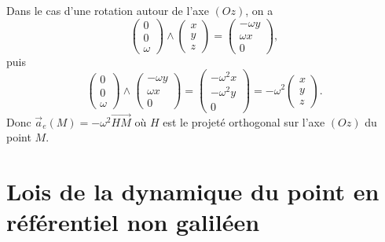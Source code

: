             \begin{example}
                Dans le cas d'une rotation autour de l'axe $(Oz)$, on a 
                \begin{equation*}
                    \begin{pmatrix}
                        0\\0\\\omega
                    \end{pmatrix}\wedge\begin{pmatrix}
                        x\\y\\z
                    \end{pmatrix}=\begin{pmatrix}
                        -\omega y\\\omega x\\0
                    \end{pmatrix},
                \end{equation*}
                puis
                \begin{equation*}
                    \begin{pmatrix}
                        0\\0\\\omega
                    \end{pmatrix}\wedge\begin{pmatrix}
                        -\omega y\\\omega x\\0
                    \end{pmatrix}=\begin{pmatrix}
                        -\omega^{2}x\\-\omega^{2}y\\0
                    \end{pmatrix}=-\omega^{2}\begin{pmatrix}
                        x\\y\\z
                    \end{pmatrix}.
                \end{equation*}
                Donc $\vec{a}_e(M)=-\omega^{2}\vec{HM}$ où $H$ est le projeté orthogonal sur l'axe $(Oz)$ du point $M$.
            \end{example}

\section[Lois de la dynamique du point]{Lois de la dynamique du point en référentiel non galiléen}